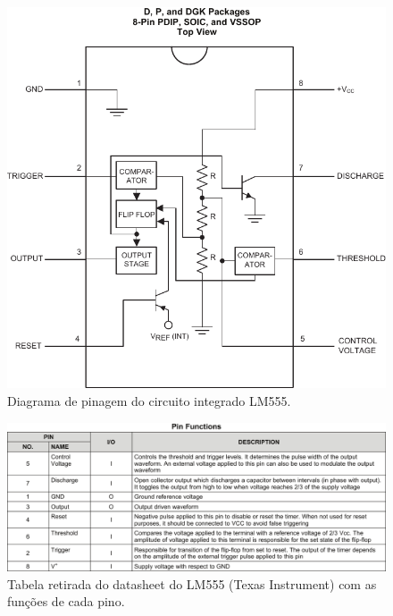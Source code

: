 \documentclass[12pt,a4paper]{article}
\begin{document}
\begin{figure}[htpb]
  \centering
  \includegraphics[width=0.8\linewidth]{img/diagrama_lm555.pdf}
  \caption{Diagrama de pinagem do circuito integrado LM555.}
  \label{fig:0}
\end{figure}
\begin{figure}[htpb]
  \centering
  \includegraphics[width=\linewidth]{img/funcoes.pdf}
  \caption{Tabela retirada do datasheet do LM555 (Texas Instrument) com as funções de cada pino.}
  \label{tab:1}
\end{figure}
\end{document}
